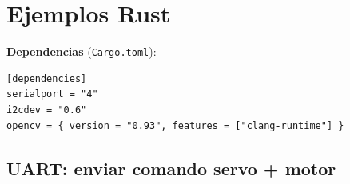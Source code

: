 \documentclass[11pt,a4paper]{article}
\begin{document}
\newpage


\section{Ejemplos Rust}

\textbf{Dependencias} (\texttt{Cargo.toml}):
\begin{lstlisting}[style=tomlstyle]
[dependencies]
serialport = "4"
i2cdev = "0.6"
opencv = { version = "0.93", features = ["clang-runtime"] }
\end{lstlisting}

\subsection{UART: enviar comando servo + motor}
\end{document}
